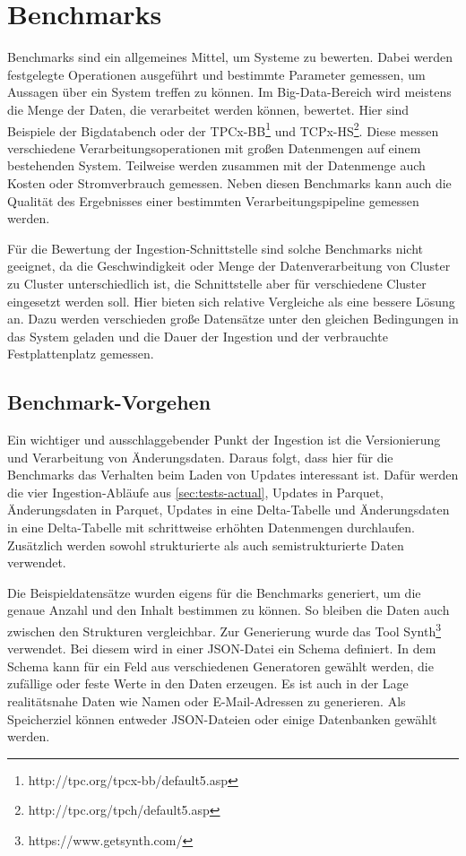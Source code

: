 \section{Benchmarks}

Benchmarks sind ein allgemeines Mittel, um Systeme zu bewerten.
Dabei werden festgelegte Operationen ausgeführt und bestimmte Parameter gemessen, um Aussagen über ein System treffen zu können.
Im Big-Data-Bereich wird meistens die Menge der Daten, die verarbeitet werden können, bewertet.
Hier sind Beispiele der Bigdatabench \parencite{bigdatabench} oder der TPCx-BB\footnote{http://tpc.org/tpcx-bb/default5.asp} und TCPx-HS\footnote{http://tpc.org/tpch/default5.asp}.
Diese messen verschiedene Verarbeitungsoperationen mit großen Datenmengen auf einem bestehenden System.
Teilweise werden zusammen mit der Datenmenge auch Kosten oder Stromverbrauch gemessen.
Neben diesen Benchmarks kann auch die Qualität des Ergebnisses einer bestimmten Verarbeitungspipeline gemessen werden.

Für die Bewertung der Ingestion-Schnittstelle sind solche Benchmarks nicht geeignet, da die Geschwindigkeit oder Menge der Datenverarbeitung von Cluster zu Cluster unterschiedlich ist, die Schnittstelle aber für verschiedene Cluster eingesetzt werden soll.
Hier bieten sich relative Vergleiche als eine bessere Lösung an.
Dazu werden verschieden große Datensätze unter den gleichen Bedingungen in das System geladen und die Dauer der Ingestion und der verbrauchte Festplattenplatz gemessen.

\subsection{Benchmark-Vorgehen}
Ein wichtiger und ausschlaggebender Punkt der Ingestion ist die Versionierung und Verarbeitung von Änderungsdaten.
Daraus folgt, dass hier für die Benchmarks das Verhalten beim Laden von Updates interessant ist.
Dafür werden die vier Ingestion-Abläufe aus \cref{sec:tests-actual}, Updates in Parquet, Änderungsdaten in Parquet, Updates in eine Delta-Tabelle und Änderungsdaten in eine Delta-Tabelle mit schrittweise erhöhten Datenmengen durchlaufen.
Zusätzlich werden sowohl strukturierte als auch semistrukturierte Daten verwendet.

Die Beispieldatensätze wurden eigens für die Benchmarks generiert, um die genaue Anzahl und den Inhalt bestimmen zu können.
So bleiben die Daten auch zwischen den Strukturen vergleichbar.
Zur Generierung wurde das Tool Synth\footnote{https://www.getsynth.com/} verwendet.
Bei diesem wird in einer JSON-Datei ein Schema definiert.
In dem Schema kann für ein Feld aus verschiedenen Generatoren gewählt werden, die zufällige oder feste Werte in den Daten erzeugen.
Es ist auch in der Lage realitätsnahe Daten wie Namen oder E-Mail-Adressen zu generieren.
Als Speicherziel können entweder JSON-Dateien oder einige Datenbanken gewählt werden.

